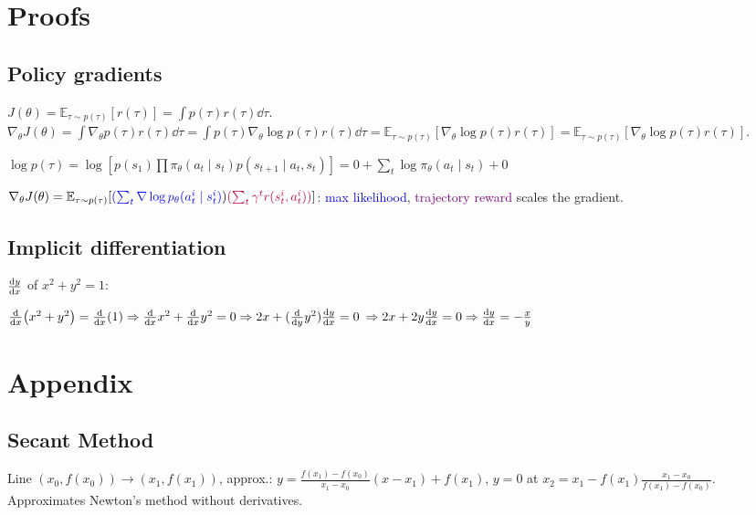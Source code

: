 \documentclass[11pt,landscape,a4paper,fleqn]{article}
\newcommand{\E}{\mathbb{E}}
\begin{document}
\begin{multicols*}{3}

\section{Proofs}

\subsection*{Policy gradients}
\quad$J(\theta) = \E_{\tau \sim p(\tau)} [r(\tau)]
= \int p(\tau) r(\tau) \dd \tau$.
$\nabla_\theta J(\theta) = \int \nabla_\theta p(\tau) r(\tau) \dd \tau
= \int p(\tau) \nabla_\theta \log p(\tau) r(\tau) \dd \tau
= \E_{\tau \sim p(\tau)} [\nabla_\theta \log p(\tau) r(\tau)] = \E_{\tau \sim p(\tau)}[\nabla_\theta \log p(\tau) r(\tau)]$.

$\log p(\tau) = \log[p(s_1)\prod \pi_\theta(a_t \mid s_t) p(s_{t+1} \mid a_t, s_t)]
= 0 + \sum_t \log \pi_\theta(a_t \mid s_t) + 0$

$\nabla_\theta J(\theta) = \E_{\tau \sim p(\tau)}
[\textcolor{blue}{(\sum_t \nabla \log p_\theta(a_t^i \mid s_t^i)})\textcolor{purple}{(\sum_t \gamma^t r(s_t^i, a_t^i))}]$:
\textcolor{blue}{max likelihood}, \textcolor{purple}{trajectory reward} scales the gradient.

\subsection*{Implicit differentiation}

$\dv{y}{x}$ of $x^2 + y^2 = 1$:

$\dv{x}(x^2 + y^2) = \dv{x}(1) \Rightarrow \dv{x}x^2 + \dv{x}y^2 = 0 \Rightarrow 2x + (\dv{y} y^2) \dv{y}{x} = 0$
$\Rightarrow 2x + 2y \dv{y}{x} = 0 \Rightarrow \dv{y}{x} =- \frac{x}{y}$

\section{Appendix}

\subsection*{Secant Method}

Line $(x_0, f(x_0)) \to (x_1, f(x_1))$, approx.:
$y = \frac{f(x_1) - f(x_0)}{x_1 - x_0}(x - x_1) + f(x_1)$,
$y = 0$ at $x_2 = x_1 - f(x_1) \frac{x_1 - x_0}{f(x_1) - f(x_0)}$.
Approximates Newton's method without derivatives.

\end{multicols*}
\end{document}
